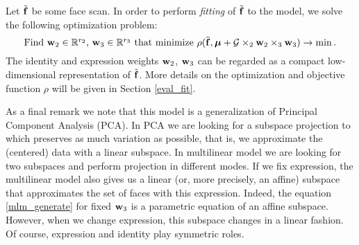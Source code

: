 Let $\tilde{{\mathbf{f}}}$ be some face scan. In order to perform \textit{fitting} of $\tilde{{\mathbf{f}}}$
to the model, we solve the following optimization problem:
\begin{equation}
\mbox{Find ${\mathbf{w}}_2 \in \mathbb{R}^{r_2}$, ${\mathbf{w}}_3 \in \mathbb{R}^{r_3}$ that minimize } \rho(\tilde{{\mathbf{f}}}, {\boldsymbol{\mu}} + \mathcal{G} \times_2 {\mathbf{w}}_2 \times_3 {\mathbf{w}}_3) \to \min.
\end{equation}
The identity and expression weights ${\mathbf{w}}_2$, ${\mathbf{w}}_3$ can be regarded as a compact low-dimensional
representation of $\tilde{{\mathbf{f}}}$. More details on the optimization and objective function $\rho$
will be given in Section \ref{eval_fit}.



As a final remark we note that this model is a generalization of Principal Component 
Analysis (PCA). In PCA we are looking for a subspace projection to which
preserves as much variation as possible, that is, we approximate
the (centered) data with a linear subspace.
In multilinear model we are looking for two subspaces and perform projection
in different modes. If we fix expression, the multilinear model
also gives us a linear (or, more precisely, an affine) subspace that approximates 
the set of faces with  this expression. Indeed,
the equation \eqref{mlm_generate} for fixed ${\mathbf{w}}_3$ is a parametric
equation of an affine subspace. However, when we change
expression, this subspace changes in a linear fashion. Of course,
expression and identity play symmetric roles.
